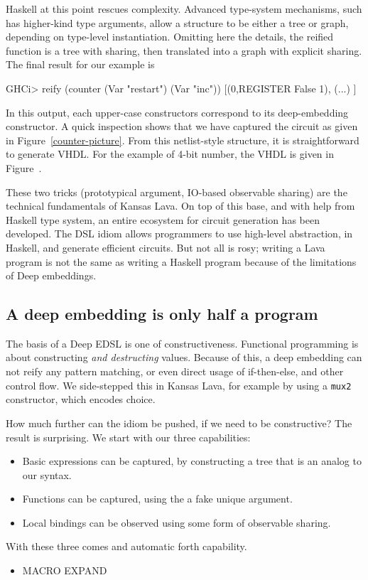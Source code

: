 \documentclass[11pt]{article}
\begin{document}
Haskell at this point rescues complexity. Advanced type-system mechanisms, such has higher-kind type
arguments, allow a structure to be either a tree or graph, depending on type-level instantiation. 
Omitting here the details, the reified function is a tree with sharing,
then translated into a graph with explicit sharing. The final result for our example is
\begin{Code}
GHCi> reify (counter (Var "restart") (Var "inc"))
[(0,REGISTER False 1),
 (...)
]
\end{Code}
In this output, each upper-case constructors correspond to its deep-embedding constructor.
A quick inspection shows that we have captured the circuit as given in Figure~\ref{counter-picture}.
From this netlist-style structure, it is straightforward to generate VHDL. For the example
of 4-bit number, the VHDL is given in Figure~\cite{counter-picutureX}.

These two tricks (prototypical argument, IO-based observable sharing) are the technical fundamentals
of Kansas Lava. On top of this base, and with help from Haskell type system, an entire ecosystem
for circuit generation has been developed. The DSL idiom allows programmers to use high-level 
abstraction, in Haskell, and generate efficient circuits. But not all is rosy; writing a Lava
program is not the same as writing a Haskell program because of the limitations of Deep
embeddings.

\subsection{A deep embedding is only half a program}

The basis of a Deep EDSL is one of constructiveness.
Functional programming is about constructing {\em and destructing\/} values.
Because of this, a deep embedding can not reify any pattern matching, 
or even direct usage of if-then-else, and other control flow. We side-stepped this
in Kansas Lava, for example by using a \verb|mux2| constructor, 
which encodes choice.

How much further can the idiom be pushed, if we need to be constructive?
The result is surprising. We start with our three capabilities:
\begin{itemize}
\item Basic expressions can be captured, by constructing a tree that is an analog to our syntax.
\item Functions can be captured, using the a fake unique argument.
\item Local bindings can be observed using some form of observable sharing.
\end{itemize}
With these three comes and automatic forth capability.
\begin{itemize}
\item MACRO EXPAND
\end{itemize}
\end{document}
